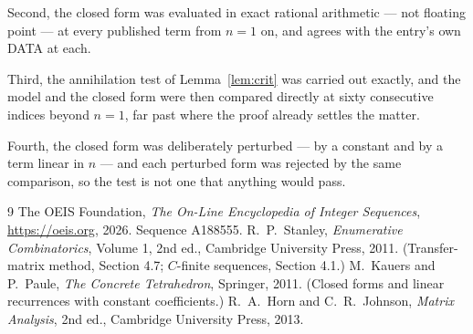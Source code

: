 \documentclass[11pt,a4paper]{article}
\theoremstyle{plain}
\theoremstyle{definition}
\begin{document}
Second, the closed form was evaluated in exact rational arithmetic --- not floating point ---
at every published term from $n=1$ on, and agrees with the entry's own DATA at each.

Third, the annihilation test of Lemma~\ref{lem:crit} was carried out exactly, and the model
and the closed form were then compared directly at sixty consecutive indices beyond
$n=1$, far past where the proof already settles the matter.

Fourth, the closed form was deliberately perturbed --- by a constant and by a term linear in
$n$ --- and each perturbed form was rejected by the same comparison, so the test is not one
that anything would pass.

\begin{thebibliography}{9}
 The OEIS Foundation, \emph{The On-Line Encyclopedia of Integer
Sequences}, \url{https://oeis.org}, 2026. Sequence A188555.
 R.~P.~Stanley, \emph{Enumerative Combinatorics}, Volume 1, 2nd ed.,
Cambridge University Press, 2011. (Transfer-matrix method, Section 4.7; $C$-finite sequences,
Section 4.1.)
 M.~Kauers and P.~Paule, \emph{The Concrete Tetrahedron}, Springer, 2011.
(Closed forms and linear recurrences with constant coefficients.)
 R.~A.~Horn and C.~R.~Johnson, \emph{Matrix Analysis}, 2nd ed., Cambridge
University Press, 2013.
\end{thebibliography}
\end{document}
